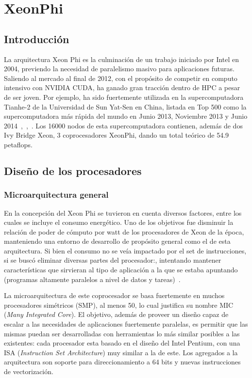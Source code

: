 
\section{XeonPhi}

\subsection{Introducci\'on}

La arquitectura Xeon Phi es la culminaci\'on de un trabajo iniciado por Intel en 2004, previendo
la necesidad de paralelismo masivo para aplicaciones futuras. Saliendo al mercado al final de 2012,
con el prop\'osito de competir en computo intensivo con NVIDIA CUDA, ha ganado gran tracci\'on dentro
de HPC a pesar de ser joven. Por ejemplo, ha sido fuertemente utilizada en la supercomputadora Tianhe-2 
de la Universidad de Sun Yat-Sen en China, listada en Top 500 como la supercomputadora m\'as r\'apida del
mundo en Junio 2013, Noviembre 2013 y Junio 2014~\cite{Top500XeonPhiJune2013},~\cite{Top500XeonPhiNov2013},~\cite{Top500XeonPhiJune2014}. Los 16000 nodos de esta supercomputadora contienen, adem\'as de dos Ivy Bridge Xeon, 3 coprocesadores
XeonPhi, dando un total te\'orico de 54.9 petaflops.

\subsection{Dise\~no de los procesadores}

\subsubsection{Microarquitectura general} 

En la concepci\'on del Xeon Phi se tuvieron en cuenta diversos factores, entre los cuales
se incluye el consumo energ\'etico. Uno de los objetivos fue disminuir la relaci\'on de
poder de c\'omputo por watt de los procesadores de Xeon de la \'epoca, manteniendo una entorno
de desarrollo de prop\'osito general como el de esta arquitectura. 
Si bien el consumo no se ve\'ia impactado por el set de instrucciones, 
si se busc\'o eliminar diversas partes del procesador:, intentando mantener 
caracter\'isticas que sirvieran al tipo de aplicaci\'on a la que se estaba 
apuntando (programas altamente paralelos a nivel de datos y tareas)~\cite{BookXeonPhi}.

La microarquitectura de este coprocesador se basa fuertemente en muchos procesadores sim\'etricos (SMP), al menos 50, lo
cual justifica su nombre MIC (\textit{Many Integrated Core}). El objetivo, adem\'as de proveer un dise\~no
capaz de escalar a las necesidades de aplicaciones fuertemente paralelas, es permitir que las mismas puedan
ser desarrolladas con herramientas lo m\'as similar posibles a las existentes: cada procesador esta basado
en el dise\~no del Intel Pentium, con una ISA (\textit{Instruction Set Architecture}) muy similar a la de este.
Los agregados a la arquitectura son soporte para direccionamiento a 64 bits y nuevas instrucciones de vectorizaci\'on.

